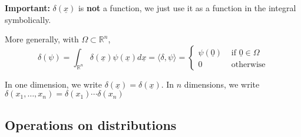 \begin{remark}
	\textbf{Important:} $\delta(\underline{x})$ is \textbf{not} a function, we just use it as a function in the integral symbolically.
\end{remark}

\begin{remark}
	More generally, with $\Omega \subset \mathbb{R}^n$,
	\[
		\delta(\psi) = \int_{\mathbb{R}^n} \delta(\underline{x}) \psi(\underline{x}) d\underline{x} = \langle \delta, \psi \rangle = \begin{cases}
			\psi(\underline{0}) & \text{ if } \underline{0} \in \Omega \\
			0 & \text{ otherwise}
		\end{cases}
	\]
\end{remark}

\begin{definition}
	In one dimension, we write $\delta(\underline{x}) = \delta(\underline{x})$. In $n$ dimensions, we write $\delta(x_1, \dots, x_n) = \delta(x_1) \cdots \delta(x_n)$
\end{definition}

\subsection{Operations on distributions}



